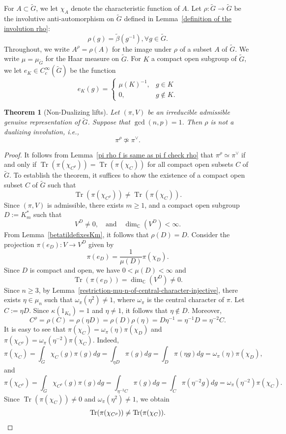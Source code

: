 \documentclass[11pt, a4paper, reqno]{amsart}
\newtheorem{theorem}{Theorem}[section]
\theoremstyle{definition}
\theoremstyle{remark}
\theoremstyle{example}
\theoremstyle{note}
\numberwithin{equation}{section}
\DeclareMathOperator{\tr}{Tr}
\begin{document}
For $A\subset \widetilde{G}$, we let $\chi_{A}$ denote the characteristic function of $A$. Let $\rho:\widetilde{G}\rightarrow \widetilde{G}$ be the involutive anti-automorphism on $\widetilde{G}$ defined in Lemma~\ref{definition of the involution rho}:  
\[\rho(g)=\tilde{\beta}(g^{-1}), \forall g \in \widetilde{G}.\]
Throughout, we write $A^{\rho}=\rho(A)$ for the image under $\rho$ of 
a subset $A$ of $\widetilde{G}$. We write
 $\mu=\mu_{\widetilde{G}}$ for the Haar measure on $\widetilde{G}$. For $K$ a compact open subgroup of $\widetilde{G}$, we let $e_K\in C_{c}^{\infty}(\widetilde{G})$ be the function 
\[e_K(g) = \begin{cases}
	\mu(K)^{-1}, & g \in K \\
	0, & g \notin K.
\end{cases}\] 



\begin{theorem}[Non-Dualizing lifts]\label{Non-Dualizing lift} Let $(\pi, V)$ be an irreducible admissible genuine representation of $\widetilde{G}$. Suppose that $\gcd(n,p)=1$. Then $\rho$ is not a dualizing involution, i.e., 
\[\pi^\rho\not\simeq\pi^\vee.\]
\end{theorem}


\begin{proof}
It follows from Lemma~\ref{pi rho f is same as pi f check rho} that $\pi^\rho\simeq\pi^\vee$ if and only if $\tr(\pi(\chi_{C^{\rho}}))=\tr(\pi(\chi_{C}))$ for all compact open subsets $C$ of $\widetilde{G}.$  
To establish the theorem, it suffices to show the existence of a compact open subset $C$ of $\widetilde{G}$ such that
\[
\tr(\pi(\chi_{C^\rho}))
\neq
\tr(\pi(\chi_C)).
\]
Since $(\pi,V)$ is admissible, there exists $m\geq 1$, and a compact open subgroup $D:=K_{m}^{*}$ such that  
\[
V^{D}\neq0,
\quad \text{and}  \quad 
\dim_{\mathbb{C}}(V^{D})<\infty.
\]
From Lemma~\ref{betatildefixesKm}, it follows that $\rho(D)=D$. Consider the projection $\pi(e_{D}): V\rightarrow V^{D}$ given by
\[
\pi(e_D)=\frac{1}{\mu(D)}\pi(\chi_D).
\]
Since $D$ is compact and open, we have $0<\mu(D)<\infty$ and 
\[
\tr(\pi(e_D))
=
\dim_{\mathbb{C}}(V^D)\neq 0.
\] 
Since $n\geq 3$, by Lemma~\ref{restriction-mu-n-of-central-character-injective}, there exists $\eta\in\mu_{n}$ such that $\omega_\pi(\eta^2)\neq1$, where $\omega_{\pi}$ is the central character of $\pi$. Let $C:=\eta D$. Since $\kappa(1_{K_{0}})=1$ and $\eta \neq 1$, it follows that $\eta\notin D$. Moreover,
\[
C^\rho=\rho(C)
=
\rho(\eta D)
=
\rho(D)\rho(\eta)
=
D\eta^{-1}
=
\eta^{-1}D
=
\eta^{-2}C.
\]
It is easy to see that $\pi(\chi_{C})=\omega_{\pi}(\eta)\pi(\chi_{D})$ and $\pi(\chi_{C^\rho})=\omega_\pi(\eta^{-2})\pi(\chi_C).
$
Indeed, 
\[ \pi(\chi_{C})= \int_{\widetilde{G}} \chi_{C}(g)\pi(g)dg = \int_{\eta D} \pi(g)dg = \int_D \pi(\eta g)dg = \omega_\pi(\eta)\pi(\chi_D),
\]
and 
\[
\pi(\chi_{C^{\rho}})= \int_{\widetilde{G}} \chi_{C^\rho}(g)\pi(g)dg = \int_{\eta^{-2}C} \pi(g)dg = \int_{C} \pi(\eta^{-2}g)dg = \omega_\pi(\eta^{-2})\pi(\chi_{C}).
\]
Since $\tr(\pi(\chi_{C}))\neq 0$ and $\omega_\pi(\eta^2)\neq 1$, 
we obtain
\[
\tr(\pi(\chi_{C^\rho}))
\neq
\tr(\pi(\chi_C)). \qedhere
\]
\end{proof}
\end{document}
